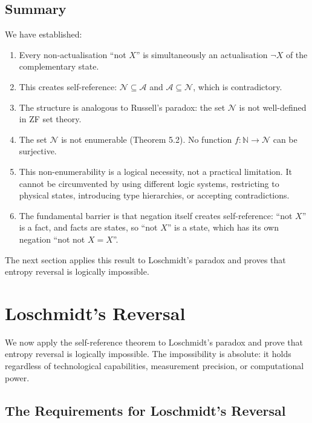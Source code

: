 \documentclass[twocolumn,10pt]{article}
\theoremstyle{definition}
\theoremstyle{remark}
\begin{document}
\subsection{Summary}

We have established:

\begin{enumerate}
\item Every non-actualisation ``not $X$'' is simultaneously an actualisation $\neg X$ of the complementary state.

\item This creates self-reference: $\mathcal{N} \subseteq \mathcal{A}$ and $\mathcal{A} \subseteq \mathcal{N}$, which is contradictory.

\item The structure is analogous to Russell's paradox: the set $\mathcal{N}$ is not well-defined in ZF set theory.

\item The set $\mathcal{N}$ is not enumerable (Theorem 5.2). No function $f : \mathbb{N} \to \mathcal{N}$ can be surjective.

\item This non-enumerability is a logical necessity, not a practical limitation. It cannot be circumvented by using different logic systems, restricting to physical states, introducing type hierarchies, or accepting contradictions.

\item The fundamental barrier is that negation itself creates self-reference: ``not $X$'' is a fact, and facts are states, so ``not $X$'' is a state, which has its own negation ``not not $X = X$''.
\end{enumerate}

The next section applies this result to Loschmidt's paradox and proves that entropy reversal is logically impossible.


\section{Loschmidt's Reversal}
\label{sec:loschmidt_fails}

We now apply the self-reference theorem to Loschmidt's paradox and prove that entropy reversal is logically impossible. The impossibility is absolute: it holds regardless of technological capabilities, measurement precision, or computational power.

\subsection{The Requirements for Loschmidt's Reversal}
\end{document}
